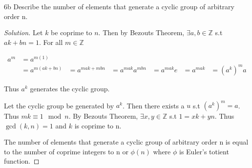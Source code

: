 \documentclass{article}
\newcommand{\Z}{\mathbb{Z}}
\newenvironment{solution}
{\renewcommand\qedsymbol{$\blacksquare$}\begin{proof}[Solution]}
{\end{proof}}
\begin{document}
\begin{PROB}{6b}\label{Problem 6b.}
    Describe the number of elements that generate a cyclic group of arbitrary order n.
\end{PROB}
\begin{solution}

    Let $k$ be coprime to $n$. Then by Bezouts Theorem, $\exists a, b \in \Z$ s.t $ak + bn = 1$. For all $m \in \Z$

    \begin{align*}{}
        a^m &= a^{m(1)} \\
        &= a^{m(ak + bn)}
        &= a^{mak + mbn}
        &= a^{mak}a^{mbn}
        &= a^{mak}e
        &= a^{mak}
        &= (a^{k})^ma
    \end{align*}

    Thus $a^k$ generates the cyclic group.

    Let the cyclic group be generated by $a^k$. Then there exists a $u$ s.t $(a^k)^m = a$. Thus $mk \equiv 1 \mod n$. By Bezouts Theorem, $\exists x, y \in \Z$ s.t $1 = xk + yn$. Thus $\gcd(k, n) = 1$ and $k$ is coprime to n.


    The number of elements that generate a cyclic group of arbitrary order n is equal to the number of coprime integers to n or $\phi(n)$ where $\phi$ is Euler's totient function.
\end{solution}
\end{document}
